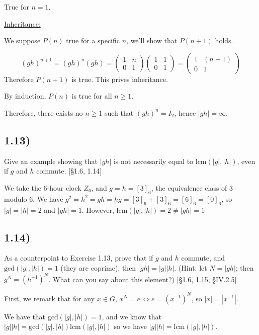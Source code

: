 True for $n = 1$.

\underline{Inheritance:}

We suppose $P(n)$ true for a specific $n$, we'll show that $P(n+1)$ holds.

$$
(gh)^{n+1} = (gh)^n(gh)
       = \begin{pmatrix} 1 & n \\ 0 & 1 \end{pmatrix} \begin{pmatrix} 1 & 1 \\ 0 & 1 \end{pmatrix}
	   = \begin{pmatrix} 1 & (n+1) \\ 0 & 1 \end{pmatrix}
$$
Therefore $P(n+1)$ is true. This prives inheritance.

By induction, $P(n)$ is true for all $n \geq 1$.

Therefore, there exists no $n \geq 1$ such that $(gh)^n = I_2$, hence $|gh| = \infty$.



\subsection*{1.13)}

Give an example showing that $|gh|$ is not necessarily equal to $\text{lcm}(|g|, |h|)$, even if $g$ and $h$ commute. [§1.6, 1.14]

We take the 6-hour clock $Z_6$, and $g = h = [3]_6$, the equivalence class of 3 modulo 6.  We have $g^2 = h^2 = gh = hg = [3]_6 + [3]_6 = [6]_6 = [0]_6$, so $|g| = |h| = 2$ and $|gh| = 1$. However, $\text{lcm}(|g|, |h|) = 2 \ne |gh| = 1$



\subsection*{1.14)}

As a counterpoint to Exercise 1.13, prove that if $g$ and $h$ commute, and $\text{gcd}(|g|, |h|) = 1$ (they are coprime), then $|gh| = |g| |h|$. (Hint: let $N = |gh|$; then $g^N = (h^{-1})^N$. What can you say about this element?) [§1.6, 1.15, §IV.2.5]

First, we remark that for any $x \in G$, $x^N = e \Leftrightarrow e = (x^{-1})^N$, so $|x| = |x^{-1}|$.

We have that $\text{gcd}(|g|, |h|) = 1$, and we know that $|g| |h| = \text{gcd}(|g|, |h|) \text{lcm}(|g|, |h|)$ so we have $|g||h| = \text{lcm}(|g|, |h|)$.

